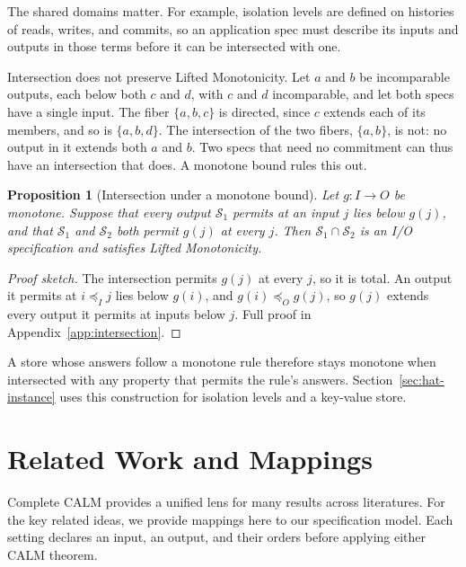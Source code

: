 \documentclass[sigconf]{cidr-2027}
\newtheorem{proposition}{Proposition}
\theoremstyle{remark}
\newcommand{\InputOrd}{\preceq_I}
\newcommand{\OutputOrd}{\preceq_O}
\newcommand{\commitment}{commitment\xspace}
\newcommand{\outrel}{extends\xspace}          %
\newcommand{\Spec}{\mathcal{S}}
\newcommand{\spectype}[1][]{I/O specification#1\xspace}
\begin{document}
The shared domains matter. For example, isolation levels are defined on
histories of reads, writes, and commits, so an application spec must describe
its inputs and outputs in those terms before it can be intersected with one.

Intersection does not preserve Lifted Monotonicity. Let $a$ and $b$ be
incomparable outputs, each below both $c$ and $d$, with $c$ and $d$
incomparable, and let both specs have a single input. The fiber $\{a,b,c\}$ is
directed, since $c$ \outrel each of its members, and so is $\{a,b,d\}$. The
intersection of the two fibers, $\{a,b\}$, is not: no output in it \outrel
both $a$ and $b$. Two specs that need no \commitment can thus have an
intersection that does. A
monotone bound rules this out.

\begin{proposition}[Intersection under a monotone bound]
\label{prop:intersection-bound}
Let $g:I\to O$ be monotone. Suppose that every output $\Spec_1$ permits at an
input $j$ lies below $g(j)$, and that $\Spec_1$ and $\Spec_2$ both permit $g(j)$
at every $j$. Then $\Spec_1\cap\Spec_2$ is an \spectype and satisfies Lifted
Monotonicity.
\end{proposition}

\begin{proof}[Proof sketch]
The intersection permits $g(j)$ at every $j$, so it is total. An output it
permits at $i\InputOrd j$ lies below $g(i)$, and $g(i)\OutputOrd g(j)$, so
$g(j)$ \outrel every output it permits at inputs below $j$. Full proof in
Appendix~\ref{app:intersection}.
\end{proof}

A store whose answers follow a monotone rule therefore stays monotone when
intersected with any property that permits the rule's answers. Section~\ref{sec:hat-instance} uses this construction for isolation levels and
a key-value store.

\section{Related Work and Mappings}
\label{sec:instances}
\label{sec:related}

\textcolor{reviewed}{Complete CALM provides a unified lens for many results across literatures.} \textcolor{reviewed}{For the key related ideas, we provide mappings here to our specification model.} \textcolor{reviewed}{Each setting declares an input, an output, and their orders before
applying either CALM theorem.}
\end{document}
